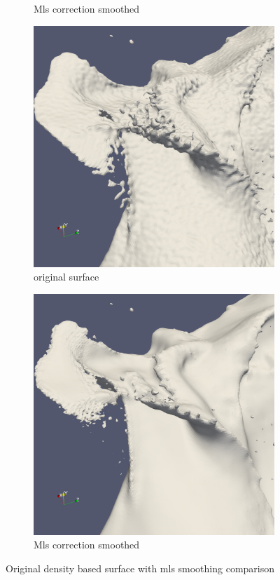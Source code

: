 \begin{figure}
\begin{center}
\begin{subfigure}[b]{0.47\textwidth}
			\caption{Mls correction smoothed}
		\end{subfigure}
		\begin{subfigure}[b]{0.47\textwidth}
			\includegraphics[width=\textwidth]{figures/CanionOriginal2.png}
			\caption{original surface}
		\end{subfigure}
		\begin{subfigure}[b]{0.47\textwidth}
			\includegraphics[width=\textwidth]{figures/CanionMls2.png}
			\caption{Mls correction smoothed}
		\end{subfigure}
	\end{center}
	\caption{Original density based surface with mls smoothing comparison} \label{fig:db_mls_reconstruction3}
\end{figure}
